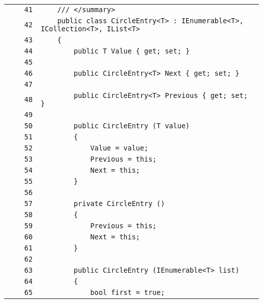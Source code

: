 \documentclass[a4paper,10pt]{article}
\begin{document}
\begin{longtable}[l]{lrrl}
\cellcolor{gray} &  & \verb~41~ & \verb~    /// </summary>~\\
\cellcolor{gray} &  & \verb~42~ & \verb~    public class CircleEntry<T> : IEnumerable<T>, ICollection<T>, IList<T>~\\
\cellcolor{gray} &  & \verb~43~ & \verb~    {~\\
\cellcolor{gray} &  & \verb~44~ & \verb~        public T Value { get; set; }~\\
\cellcolor{gray} &  & \verb~45~ & \verb~~\\
\cellcolor{gray} &  & \verb~46~ & \verb~        public CircleEntry<T> Next { get; set; }~\\
\cellcolor{gray} &  & \verb~47~ & \verb~~\\
\cellcolor{gray} &  & \verb~48~ & \verb~        public CircleEntry<T> Previous { get; set; }~\\
\cellcolor{gray} &  & \verb~49~ & \verb~~\\
\cellcolor{gray} &  & \verb~50~ & \verb~        public CircleEntry (T value)~\\
\cellcolor{gray} &  & \verb~51~ & \verb~        {~\\
\cellcolor{gray} &  & \verb~52~ & \verb~            Value = value;~\\
\cellcolor{gray} &  & \verb~53~ & \verb~            Previous = this;~\\
\cellcolor{gray} &  & \verb~54~ & \verb~            Next = this;~\\
\cellcolor{gray} &  & \verb~55~ & \verb~        }~\\
\cellcolor{gray} &  & \verb~56~ & \verb~~\\
\cellcolor{gray} &  & \verb~57~ & \verb~        private CircleEntry ()~\\
\cellcolor{gray} &  & \verb~58~ & \verb~        {~\\
\cellcolor{gray} &  & \verb~59~ & \verb~            Previous = this;~\\
\cellcolor{gray} &  & \verb~60~ & \verb~            Next = this;~\\
\cellcolor{gray} &  & \verb~61~ & \verb~        }~\\
\cellcolor{gray} &  & \verb~62~ & \verb~~\\
\cellcolor{gray} &  & \verb~63~ & \verb~        public CircleEntry (IEnumerable<T> list)~\\
\cellcolor{gray} &  & \verb~64~ & \verb~        {~\\
\cellcolor{gray} &  & \verb~65~ & \verb~            bool first = true;~\\

\end{longtable}
\end{document}
